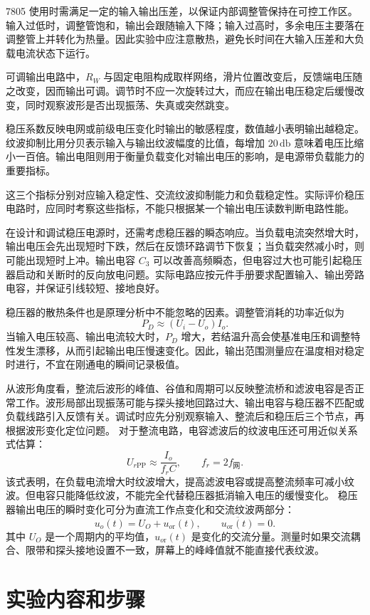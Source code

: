 \documentclass{../template/myrpt}
\begin{document}
7805 使用时需满足一定的输入输出压差，以保证内部调整管保持在可控工作区。输入过低时，调整管饱和，输出会跟随输入下降；输入过高时，多余电压主要落在调整管上并转化为热量。因此实验中应注意散热，避免长时间在大输入压差和大负载电流状态下运行。

可调输出电路中，$R_W$ 与固定电阻构成取样网络，滑片位置改变后，反馈端电压随之改变，因而输出可调。调节时不应一次旋转过大，而应在输出电压稳定后缓慢改变，同时观察波形是否出现振荡、失真或突然跳变。

稳压系数反映电网或前级电压变化时输出的敏感程度，数值越小表明输出越稳定。纹波抑制比用分贝表示输入与输出纹波幅度的比值，每增加 $20\,\si{\decibel}$ 意味着电压比缩小一百倍。输出电阻则用于衡量负载变化对输出电压的影响，是电源带负载能力的重要指标。

这三个指标分别对应输入稳定性、交流纹波抑制能力和负载稳定性。实际评价稳压电路时，应同时考察这些指标，不能只根据某一个输出电压读数判断电路性能。

在设计和调试稳压电源时，还需考虑稳压器的瞬态响应。当负载电流突然增大时，输出电压会先出现短时下跌，然后在反馈环路调节下恢复；当负载突然减小时，则可能出现短时上冲。输出电容 $C_3$ 可以改善高频瞬态，但电容过大也可能引起稳压器启动和关断时的反向放电问题。实际电路应按元件手册要求配置输入、输出旁路电容，并保证引线较短、接地良好。

稳压器的散热条件也是原理分析中不能忽略的因素。调整管消耗的功率近似为
\[
  P_D\approx(U_i-U_o)I_o.
\]
当输入电压较高、输出电流较大时，$P_D$ 增大，若结温升高会使基准电压和调整特性发生漂移，从而引起输出电压慢速变化。因此，输出范围测量应在温度相对稳定时进行，不宜在刚通电的瞬间记录极值。

从波形角度看，整流后波形的峰值、谷值和周期可以反映整流桥和滤波电容是否正常工作。波形局部出现振荡可能与探头接地回路过大、输出电容与稳压器不匹配或负载线路引入反馈有关。调试时应先分别观察输入、整流后和稳压后三个节点，再根据波形变化定位问题。
对于整流电路，电容滤波后的纹波电压还可用近似关系式估算：
\[
  U_{r\mathrm{PP}}\approx\frac{I_o}{f_r C},\qquad f_r=2f_{\text{网}}.
\]
该式表明，在负载电流增大时纹波增大，提高滤波电容或提高整流频率可减小纹波。但电容只能降低纹波，不能完全代替稳压器抵消输入电压的缓慢变化。
稳压器输出电压的瞬时变化可分为直流工作点变化和交流纹波两部分：
\[
  u_o(t)=U_{O}+u_{o\mathrm{r}}(t),
  \qquad \overline{u_{o\mathrm{r}}(t)}=0.
\]
其中 $U_O$ 是一个周期内的平均值，$u_{o\mathrm{r}}(t)$ 是变化的交流分量。测量时如果交流耦合、限带和探头接地设置不一致，屏幕上的峰峰值就不能直接代表纹波。

\clearpage

\section{实验内容和步骤}
\end{document}
